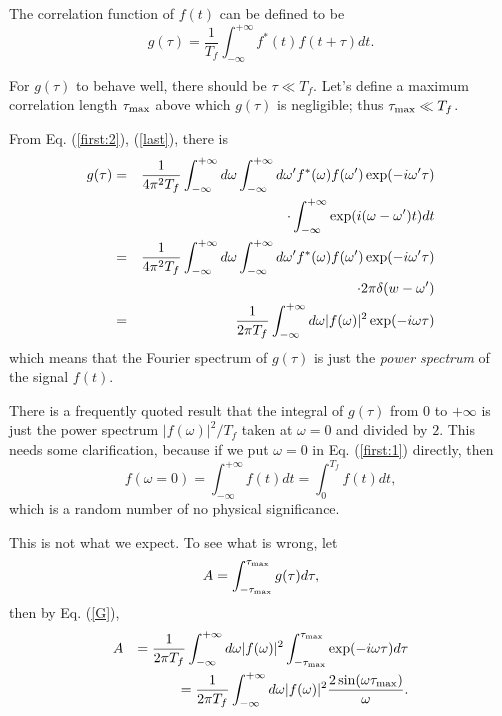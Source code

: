 The correlation function of $f(t)$ can be defined to be
\begin{equation}
g(\tau) = \frac{1}{T_{f}} \int^{+\infty}_{-\infty} f^*(t)f(t+\tau) dt.
\label{last}
\end{equation}

For $g(\tau)$ to behave well, there should be $\tau \ll T_{f}$. Let's
define a maximum correlation length $\tau_{\rm max}$ above which
$g(\tau)$ is negligible; thus $\tau_{\rm max} \ll T_{f}$.

From Eq. (\ref{first:2}), (\ref{last}), there is
\begin{eqnarray} 
g(\tau) =&& \frac{1}{4\pi^2 T_{f}} \int^{+\infty}_{-\infty} d\omega
\int^{+\infty}_{-\infty} d\omega^\prime f^*(\omega) f(\omega^\prime) 
\exp (-i\omega^\prime \tau) \nonumber\\
&& \;\;\;\;\;\;\;\;\;\;\;\;\;\;\;\;\;\;\;\;\;\;\;
 \cdot \int^{+\infty}_{-\infty} \exp(i(\omega-\omega^\prime)t) dt 
\nonumber\\
=&& \frac{1}{4\pi^2 T_{f}} \int^{+\infty}_{-\infty} d\omega 
\int^{+\infty}_{-\infty} d\omega^\prime f^*(\omega) f(\omega^\prime) 
\exp (-i\omega^\prime \tau) \nonumber\\
&& \;\;\;\;\;\;\;\;\;\;\;\;\;\;\;\;\;\;\;\;\;\;\;
 \cdot  2\pi{\rm \delta} (w-\omega^\prime) \nonumber\\
=&& \frac{1}{2\pi T_{f}} \int^{+\infty}_{-\infty} d\omega |f(\omega)|^2 
\exp (-i\omega \tau) 
\label{G}
\end{eqnarray}
which means that the Fourier spectrum of $g(\tau)$ is just the {\em
  power spectrum} of the signal $f(t)$.

There is a frequently quoted result that the integral of $g(\tau)$
from $0$ to $+\infty$ is just the power spectrum $|f(\omega)|^2/T_{f}$
taken at $\omega = 0$ and divided by $2$\cite{Lee}. This needs some
clarification, because if we put $\omega = 0$ in Eq.
(\ref{first:1}) directly, then
\begin{equation} 
f(\omega=0) = \int^{+\infty}_{-\infty} f(t) dt = \int_{0}^{T_{f}} f(t) dt,
\end{equation}
which is a random number of no physical significance.

This is not what we expect. To see what is wrong, let
\begin{equation} 
A = \int^{\tau_{\rm max}}_{-\tau_{\rm max}} g(\tau)  d\tau,
\end{equation}
then by Eq. (\ref{G}),
\begin{eqnarray} 
A &&= \frac{1}{2\pi T_{f}} \int^{+\infty}_{-\infty} d\omega |f(\omega)|^2
\int^{\tau_{\rm max}}_{-\tau_{\rm max}} \exp (-i\omega \tau) d\tau \nonumber\\ 
&&= \frac{1}{2\pi T_{f}} \int^{+\infty}_{-\infty}  
d\omega |f(\omega)|^2 
\frac{2\sin(\omega \tau_{\rm max})}{\omega}. 
\label{puff}
\end{eqnarray} 


